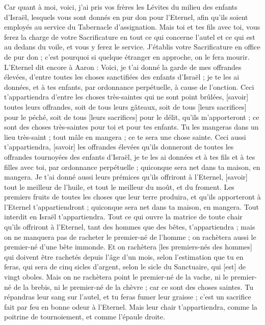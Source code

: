 \begin{multicols}{2}
Car quant à moi, voici, j'ai pris vos frères les Lévites du milieu des enfants d'Israël, lesquels vous sont donnés en pur don pour l'Eternel, afin qu'ils soient employés au service du Tabernacle d'assignation.
Mais toi et tes fils avec toi, vous ferez la charge de votre Sacrificature en tout ce qui concerne l'autel et ce qui est au dedans du voile, et vous y ferez le service. J'établis votre Sacrificature en office de pur don ; c'est pourquoi si quelque étranger en approche, on le fera mourir.
L'Eternel dit encore à Aaron : Voici, je t'ai donné la garde de mes offrandes élevées, d'entre toutes les choses sanctifiées des enfants d'Israël ; je te les ai données, et à tes enfants, par ordonnance perpétuelle, à cause de l'onction.
Ceci t'appartiendra d'entre les choses très-saintes qui ne sont point brûlées, [savoir] toutes leurs offrandes, soit de tous leurs gâteaux, soit de tous [leurs sacrifices] pour le péché, soit de tous [leurs sacrifices] pour le délit, qu'ils m'apporteront ; ce sont des choses très-saintes pour toi et pour tes enfants.
Tu les mangeras dans un lieu très-saint ; tout mâle en mangera ; ce te sera une chose sainte.
Ceci aussi t'appartiendra, [savoir] les offrandes élevées qu'ils donneront de toutes les offrandes tournoyées des enfants d'Israël, je te les ai données et à tes fils et à tes filles avec toi, par ordonnance perpétuelle ; quiconque sera net dans ta maison, en mangera.
Je t'ai donné aussi leurs prémices qu'ils offriront à l'Eternel, [savoir] tout le meilleur de l'huile, et tout le meilleur du moût, et du froment.
Les premiers fruits de toutes les choses que leur terre produira, et qu'ils apporteront à l'Eternel t'appartiendront ; quiconque sera net dans ta maison, en mangera.
Tout interdit en Israël t'appartiendra.
Tout ce qui ouvre la matrice de toute chair qu'ils offriront à l'Eternel, tant des hommes que des bêtes, t'appartiendra ; mais on ne manquera pas de racheter le premier-né de l'homme ; on rachètera aussi le premier-né d'une bête immonde.
Et on rachètera [les premiers-nés des hommes] qui doivent être rachetés depuis l'âge d'un mois, selon l'estimation que tu en feras, qui sera de cinq sicles d'argent, selon le sicle du Sanctuaire, qui [est] de vingt oboles.
Mais on ne rachètera point le premier-né de la vache, ni le premier-né de la brebis, ni le premier-né de la chèvre ; car ce sont des choses saintes. Tu répandras leur sang sur l'autel, et tu feras fumer leur graisse ; c'est un sacrifice fait par feu en bonne odeur à l'Eternel.
Mais leur chair t'appartiendra, comme la poitrine de tournoiement, et comme l'épaule droite.

\end{multicols}
